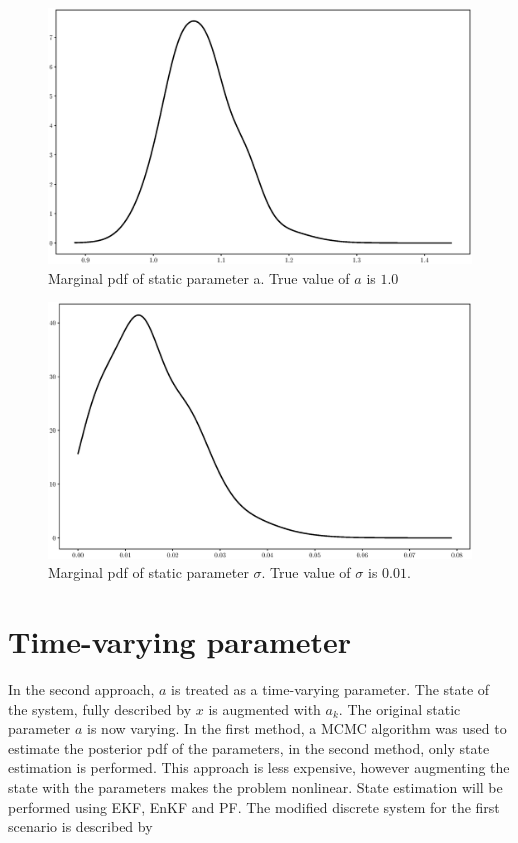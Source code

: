 \documentclass[]{elsarticle}
\begin{document}
\begin{figure}[!htb]
\centering
\includegraphics[width=\linewidth,keepaspectratio]{./figs/case00_a.eps}
\caption{Marginal pdf of static parameter a. True value of $a$ is $1.0$}
\label{fig:a}
\end{figure}

\begin{figure}[!htb]
\centering
\includegraphics[width=\linewidth,keepaspectratio]{./figs/case00_sigma.eps}
\caption{Marginal pdf of static parameter $\sigma$. True value of $\sigma$ is $0.01$.}
\label{fig:sigma}
\end{figure}

\section*{Time-varying parameter}
In the second approach, $a$ is treated as a time-varying parameter. The state of the system, fully described by $x$ is augmented with $a_k$. The original static parameter $a$ is now varying. In the first method, a MCMC algorithm was used to estimate the posterior pdf of the parameters, in the second method, only state estimation is performed. This approach is less expensive, however augmenting the state with the parameters makes the problem nonlinear. State estimation will be performed using EKF, EnKF and PF. The modified discrete system for the first scenario is described by 
\end{document}
